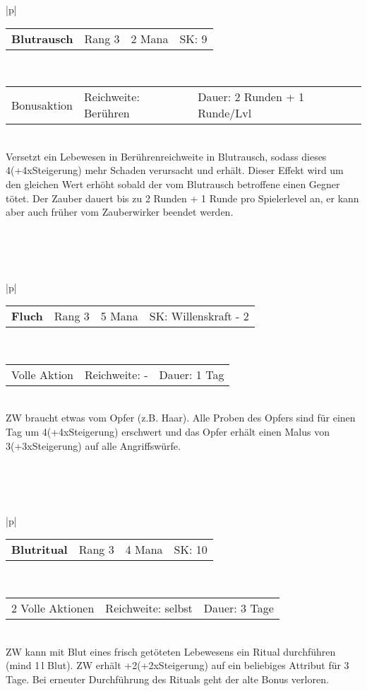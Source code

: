 \documentclass[../../Heldenanleitung2]{subfiles}
\begin{document}
\begin{tabular}{|p{\textwidth}|}
\hline
\begin{tabularx}{\textwidth}{X|X|X|X}
\textbf{Blutrausch} & Rang 3 & 2 Mana & SK: 9
\end{tabularx} \\ \hline
\begin{tabularx}{\textwidth}{X|X|X}
Bonusaktion & Reichweite: Berühren & Dauer: 2 Runden + 1 Runde/Lvl
\end{tabularx} \\ \hline
Versetzt ein Lebewesen in Berührenreichweite in Blutrausch, sodass dieses 4(+4xSteigerung) mehr Schaden verursacht und erhält. Dieser Effekt wird um den gleichen Wert erhöht sobald der vom Blutrausch betroffene einen Gegner tötet. Der Zauber dauert bis zu 2 Runden + 1 Runde pro Spielerlevel an, er kann aber auch früher vom Zauberwirker beendet werden.
\\ \hline
\end{tabular}
\\\\\\
\begin{tabular}{|p{\textwidth}|}
\hline
\begin{tabularx}{\textwidth}{X|X|X|X}
\textbf{Fluch} & Rang 3 & 5 Mana & SK: Willenskraft - 2
\end{tabularx} \\ \hline
\begin{tabularx}{\textwidth}{X|X|X}
Volle Aktion & Reichweite: - & Dauer: 1 Tag
\end{tabularx} \\ \hline
ZW braucht etwas vom Opfer (z.B. Haar). Alle Proben des Opfers sind für einen Tag um 4(+4xSteigerung) erschwert und das Opfer erhält einen Malus von 3(+3xSteigerung) auf alle Angriffswürfe.
\\ \hline
\end{tabular}
\\\\\\
\begin{tabular}{|p{\textwidth}|}
\hline
\begin{tabularx}{\textwidth}{X|X|X|X}
\textbf{Blutritual} & Rang 3 & 4 Mana & SK: 10
\end{tabularx} \\ \hline
\begin{tabularx}{\textwidth}{X|X|X}
2 Volle Aktionen & Reichweite: selbst & Dauer: 3 Tage
\end{tabularx} \\ \hline
ZW kann mit Blut eines frisch getöteten Lebewesens ein Ritual durchführen (mind 1\,l Blut). ZW erhält +2(+2xSteigerung) auf ein beliebiges Attribut für 3 Tage. Bei erneuter Durchführung des Rituals geht der alte Bonus verloren.
\\ \hline
\end{tabular}
\end{document}

